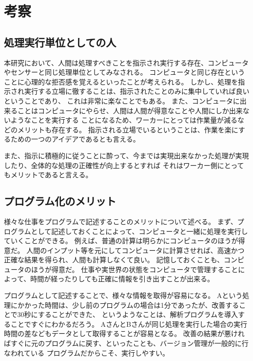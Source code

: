 \chapter{考察}\label{chap:discussion}

\section{処理実行単位としての人}\label{ux51e6ux7406ux5b9fux884cux5358ux4f4dux3068ux3057ux3066ux306eux4eba}

本研究において、人間は処理すべきことを指示され実行する存在、コンピュータやセンサーと同じ処理単位としてみなされる。
コンピュータと同じ存在ということに心理的な拒否感を覚えるといったことが考えられる。
しかし、処理を指示され実行する立場に徹することは、指示されたことのみに集中していれば良いということであり、
これは非常に楽なことでもある。
また、コンピュータに出来ることはコンピュータにやらせ、人間は人間が得意なことや人間にしか出来ないようなことを実行する
ことになるため、ワーカーにとっては作業量が減るなどのメリットも存在する。
指示される立場でいるということは、作業を楽にするための一つのアイデアであるとも言える。

また、指示に積極的に従うことに酔って、今までは実現出来なかった処理が実現したり、全体的な処理の正確性が向上するとすれば
それはワーカー側にとってもメリットであると言える。

\section{プログラム化のメリット}\label{ux30d7ux30edux30b0ux30e9ux30e0ux5316ux306eux30e1ux30eaux30c3ux30c8}

様々な仕事をプログラムで記述することのメリットについて述べる。
まず、プログラムとして記述しておくことによって、コンピュータと一緒に処理を実行していくことができる。
例えば、普通の計算は明らかにコンピュータのほうが得意だ。
人間のインプット等を元にしてコンピュータに計算させれば、高速かつ正確な結果を得られ、人間も計算しなくて良い。
記憶しておくことも、コンピュータのほうが得意だ。
仕事や実世界の状態をコンピュータで管理することによって、時間が経ったりしても正確に情報を引き出すことが出来る。

プログラムとして記述することで、様々な情報を取得が容易になる。
Aという処理にかかった時間は、少し前のプログラムの場合は1分であったが、改善することで30秒にすることができた、
というようなことは、解析プログラムを導入することですぐにわかるだろう。
AさんとBさんが同じ処理を実行した場合の実行時間の差などもデータとして取得することが容易となる。
改善の結果が悪ければすぐに元のプログラムに戻す、といったことも、バージョン管理が一般的に行なわれている
プログラムだからこそ、実行しやすい。


